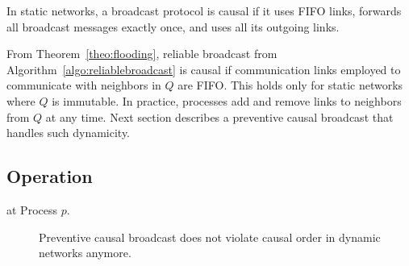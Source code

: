 \begin{theorem}
  In static networks, a broadcast protocol is causal if it uses FIFO links,
  forwards all broadcast messages exactly once, and uses all its outgoing links.
\end{theorem}

From Theorem~\ref{theo:flooding}, reliable broadcast from
Algorithm~\ref{algo:reliablebroadcast} is causal if communication links employed
to communicate with neighbors in $Q$ are FIFO. This holds only for static
networks where $Q$ is immutable. In practice, processes add and remove links to
neighbors from $Q$ at any time. Next section describes a preventive causal
broadcast that handles such dynamicity.


\subsection{Operation}

\begin{algorithm}[h]
  
  \caption{\label{algo:bufferbroadcast}\CBROADCAST at Process $p$.}
\end{algorithm}

\begin{figure*}
  \begin{center}
    \hspace{20pt}
    \hspace{20pt}
    \hspace{20pt}
    \hspace{20pt}
    \caption{\label{fig:preventivesolve}Preventive causal broadcast does not violate
      causal order in dynamic networks anymore.}
  \end{center}
\end{figure*}

